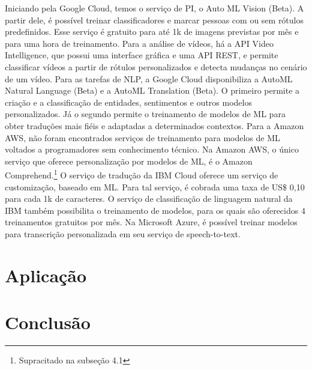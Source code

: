 \documentclass{article}
\begin{document}
Iniciando pela Google Cloud, temos o serviço de PI, o Auto ML Vision (Beta). A partir dele, é possível treinar classificadores e marcar pessoas com ou sem rótulos predefinidos. Esse serviço é gratuito para até 1k de imagens previstas por mês e para uma hora de treinamento. Para a análise de vídeos, há a API Video Intelligence, que possui uma interface gráfica e uma API REST, e permite classificar vídeos a partir de rótulos personalizados e detecta mudanças no cenário de um vídeo. Para as tarefas de NLP, a Google Cloud disponibiliza a AutoML Natural Language (Beta) e a AutoML Translation (Beta). O primeiro permite a criação e a classificação de entidades, sentimentos e outros modelos personalizados. Já o segundo permite o treinamento de modelos de ML para obter traduções mais fiéis e adaptadas a determinados contextos. Para a Amazon AWS, não foram encontrados serviços de treinamento para modelos de ML voltados a programadores sem conhecimento técnico. Na Amazon AWS, o único serviço que oferece personalização por modelos de ML, é o Amazon Comprehend.\footnote{Supracitado na subseção 4.1}
O serviço de tradução da IBM Cloud oferece um serviço de customização, baseado em ML. Para tal serviço, é cobrada uma taxa de US\$ 0,10 para cada 1k de caracteres. O serviço de classificação de linguagem natural da IBM também possibilita o treinamento de modelos, para os quais são oferecidos 4 treinamentos gratuitos por mês. Na Microsoft Azure, é possível treinar modelos para transcrição personalizada em seu serviço de speech-to-text.

\section{Aplicação}

\section{Conclusão}
\label{sec:headings}


%   





\end{document}
